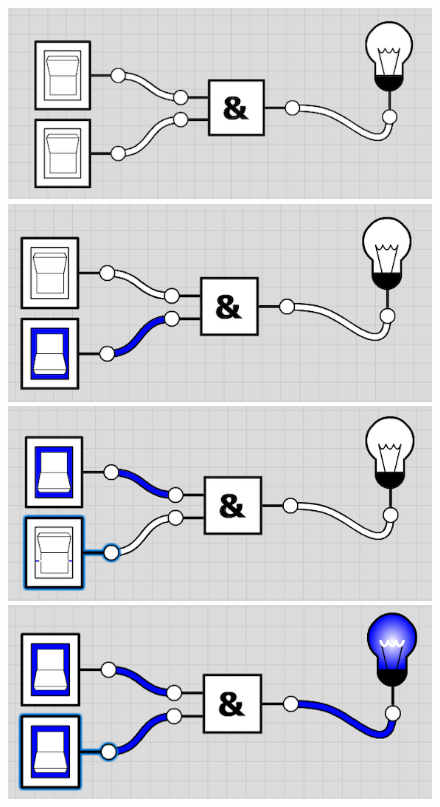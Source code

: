 \begin{figure}[htb]
\centering
\begin{minipage}{0.225\textwidth}
\includegraphics[width=\textwidth]{./and/and_off_off}
\end{minipage}
\begin{minipage}{0.225\textwidth}
\includegraphics[width=\textwidth]{./and/and_off_on}
\end{minipage}
\begin{minipage}{0.225\textwidth}
\includegraphics[width=\textwidth]{./and/and_on_off}
\end{minipage}
\begin{minipage}{0.225\textwidth}
\includegraphics[width=\textwidth]{./and/and_on_on}

\end{minipage}
\end{figure}
